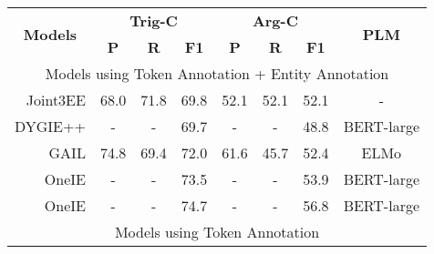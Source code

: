 \documentclass[11pt,a4paper]{article}
\begin{document}
\begin{table*}[!t]
  \centering
  \begin{tabular}{r|ccc|ccc|c}
    \toprule
    \multicolumn{1}{c}{\multirow{2}[0]{*}{\textbf{Models}}} & \multicolumn{3}{c}{\textbf{Trig-C}} & \multicolumn{3}{c}{\textbf{Arg-C}} & \multirow{2}[0]{*}{\textbf{PLM}}                                                               \\
    \cmidrule(r){2-4} \cmidrule(r){5-7}
                                                            & \textbf{P}                          & \textbf{R}                         & \textbf{F1}                      & \textbf{P} & \textbf{R} & \textbf{F1} &                     \\
    \midrule
    \multicolumn{8}{c}{Models using Token Annotation + Entity Annotation}                                                                                                                                                               \\
    \midrule
    Joint3EE \citep{Nguyen-Nguyen:2019:AAAI2019}            & 68.0                                & 71.8                               & 69.8                             & 52.1       & 52.1       & 52.1        & -                   \\
    DYGIE++  \citep{wadden-etal-2019-entity}                & -                                   & -                                  & 69.7                             & -          & -          & 48.8        & BERT-large          \\
    GAIL \citep{Zhang:2019:GAIL}                            & 74.8                                & 69.4                               & 72.0                             & 61.6       & 45.7       & 52.4        & ELMo                \\
    OneIE \citep{lin-etal-2020-joint} & -                                   & -                                  & 73.5                             & -          & -          & 53.9        & BERT-large          \\
    OneIE \citep{lin-etal-2020-joint}                       & -                                   & -                                  & 74.7                             & -          & -          & 56.8        & BERT-large          \\
    \midrule
    \multicolumn{8}{c}{Models using Token Annotation}                                                                                                                                                                                   \\

\end{tabular}
\end{table*}
\end{document}
